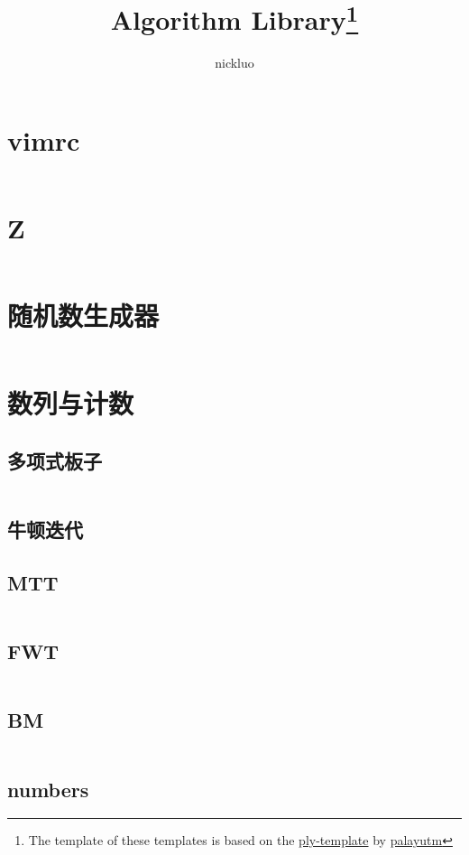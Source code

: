 \documentclass[a4paper,9]{article}
\author{nickluo}
\title{Algorithm Library\footnote{The template of these templates is based on the \href{https://github.com/palayutm/ply-template}{ply-template} by \href{https://github.com/palayutm}{palayutm}}}
\begin{document}
\twocolumn  %

\maketitle %
\tableofcontents %

\section{vimrc}
\inputminted[breaklines]{vim}{vimrc/vimrc}

\section{Z}
\inputminted[breaklines]{c++}{Z/z.cpp} %

\section{随机数生成器}
\inputminted[breaklines]{c++}{random/rand_gen.cpp}

\section{数列与计数}
\subsection{多项式板子}
\inputminted[breaklines]{c++}{sequence/polynomial.cpp}
\subsection{牛顿迭代}

\subsection{MTT}
\inputminted[breaklines]{c++}{sequence/mtt.cpp}
\subsection{FWT}
\inputminted[breaklines]{c++}{sequence/fwt.cpp}
\subsection{BM}
\inputminted[breaklines]{c++}{sequence/bm.cpp}
\subsection{numbers}

\end{document}
